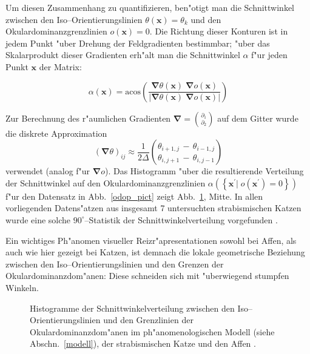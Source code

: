 Um diesen Zusammenhang zu quantifizieren, ben"otigt man die Schnittwinkel
zwischen den Iso--Orientierungslinien $\theta(\mathbf{x})=\theta_k$ und den
Okulardominanzgrenzlinien $o(\mathbf{x}) = 0$.  Die Richtung dieser
Konturen ist in jedem Punkt "uber Drehung der Feldgradienten bestimmbar;
"uber das Skalarprodukt dieser Gradienten erh"alt man die Schnittwinkel
$\alpha$ f"ur jeden Punkt $\mathbf{x}$ der Matrix:

\begin{equation*}
\alpha(\mathbf{x})=\text{acos}\!\left(\frac{\pmb\nabla\theta(\mathbf{x})
\;\pmb\nabla o(\mathbf{x})}{\vert\pmb\nabla\theta(\mathbf{x})\;\pmb\nabla
o(\mathbf{x})\vert}\right)
\end{equation*}

Zur Berechnung des r"aumlichen Gradienten $\pmb\nabla =
{\partial_1\choose\partial_2}$ auf dem Gitter wurde die diskrete
Approximation
\begin{equation*}
(\pmb\nabla\theta)_{ij}\approx\frac{1}{2\Delta}{{\theta_{i+1,j}\,-\,\theta_{i-1,j}}\choose{\theta_{i,j+1}\,-\,\theta_{i,j-1}}}
\end{equation*}
verwendet (analog f"ur $\pmb\nabla o$). Das Histogramm "uber die
resultierende Verteilung der Schnittwinkel auf den
Okulardominanzgrenzlinien $\alpha(\left\{\mathbf{x}^\prime\vert\;
o(\mathbf{x}^\prime)=0\right\})$ f"ur den Datensatz in Abb.~\ref{odop_pict}
zeigt Abb.~\ref{odop_hist}, Mitte. In allen vorliegenden Datens"atzen aus
insgesamt 7 untersuchten strabismischen Katzen wurde eine solche
$90^\circ$--Statistik der Schnittwinkelverteilung vorgefunden
.

Ein wichtiges Ph"anomen visueller Reizr"apresentationen sowohl bei Affen,
als auch wie hier gezeigt bei Katzen, ist demnach die lokale geometrische
Beziehung zwischen den Iso--Orientierungslinien und den Grenzen der
Okulardominanzdom"anen: Diese schneiden sich mit "uberwiegend stumpfen
Winkeln.

\begin{figure}[t]
\begin{center}
\end{center}
\caption{Histogramme der Schnittwinkelverteilung zwischen den
Iso--Orien\-tier\-ungs\-linien und den Grenzlinien der Okulardominanzdom"anen
im ph"anomenologischen Modell (siehe Abschn.~\ref{modell}), der
strabismischen Katze \protect{} und den Affen
\protect{}.}
\label{odop_hist}
\end{figure}

